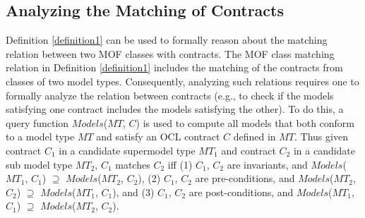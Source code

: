 \begin{definition}
\begin{enumerate}
\begin{enumerate}
		\end{enumerate} 	


\end{enumerate}

\label{definition1}
\end{definition}


\subsection{Analyzing the Matching of Contracts}\label{analyzingcontract}

Definition \ref{definition1} can be used to formally reason about the matching relation between two MOF classes with contracts. 
The MOF class matching relation in Definition \ref{definition1} includes the matching of the contracts from classes of two model types. 
Consequently, analyzing such relations requires one to formally analyze the relation between contracts (e.g., to check if the models satisfying one contract includes the models satisfying the other).
To do this, a query function $Models$($MT$, $C$) is used to compute all models that both conform to a model type $MT$ and satisfy an OCL contract $C$ defined in $MT$. %
Thus given contract $C_1$ in a candidate supermodel type $MT_1$ and contract $C_2$ in a candidate sub model type $MT_2$, $C_1$ matches $C_2$ iff (1) $C_1$, $C_2$ are invariants, and $Models$($MT_1$, $C_1$) $\supseteq$ $Models$($MT_2$, $C_2$), (2) $C_1$, $C_2$ are pre-conditions, and $Models$($MT_2$, $C_2$) $\supseteq$ $Models$($MT_1$, $C_1$), and (3) $C_1$, $C_2$ are post-conditions, and $Models$($MT_1$, $C_1$) $\supseteq$ $Models$($MT_2$, $C_2$). 

